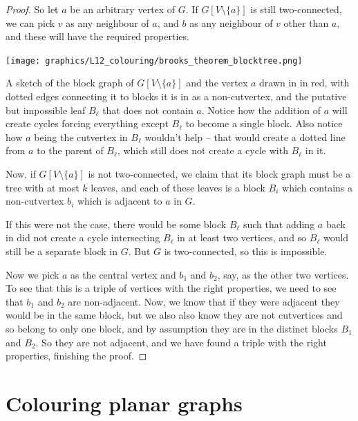 \documentclass[nobib]{tufte-handout}
\begin{document}
\begin{theorem}[Brooks, 1941]
\begin{proof}
    So let $a$ be an arbitrary vertex of $G$. If $G[V \setminus \{a\}]$ is still two-connected, we can pick $v$ as any neighbour of $a$, and $b$ as any neighbour of $v$ other than $a$, and these will have the required properties.

    \begin{marginfigure}
      \centering
      \texttt{[image: graphics/L12\_colouring/brooks\_theorem\_blocktree.png]}
      \caption{A sketch of the block graph of $G[V \setminus \{a\}]$ and the vertex $a$ drawn in in red, with dotted edges connecting it to blocks it is in as a non-cutvertex, and the putative but impossible leaf $B_\ell$ that does not contain $a$. Notice how the addition of $a$ will create cycles forcing everything except $B_\ell$ to become a single block. Also notice how $a$ being the cutvertex in $B_\ell$ wouldn't help -- that would create a dotted line from $a$ to the parent of $B_\ell$, which still does not create a cycle with $B_\ell$ in it.}
    \end{marginfigure}

    Now, if $G[V \setminus \{a\}]$ is not two-connected, we claim that its block graph must be a tree with at most $k$ leaves, and each of these leaves is a block $B_i$ which contains a non-cutvertex $b_i$ which is adjacent to $a$ in $G$. 
    
    If this were not the case, there would be some block $B_\ell$ such that adding $a$ back in did not create a cycle intersecting $B_\ell$ in at least two vertices, and so $B_\ell$ would still be a separate block in $G$. But $G$ is two-connected, so this is impossible.
    
    Now we pick $a$ as the central vertex and $b_1$ and $b_2$, say, as the other two vertices. To see that this is a triple of vertices with the right properties, we need to see that $b_1$ and $b_2$ are non-adjacent. Now, we know that if they were adjacent they would be in the same block, but we also also know they are not cutvertices and so belong to only one block, and by assumption they are in the distinct blocks $B_1$ and $B_2$. So they are not adjacent, and we have found a triple with the right properties, finishing the proof.
  \end{proof}
\end{theorem}

\section{Colouring planar graphs}
\end{document}
